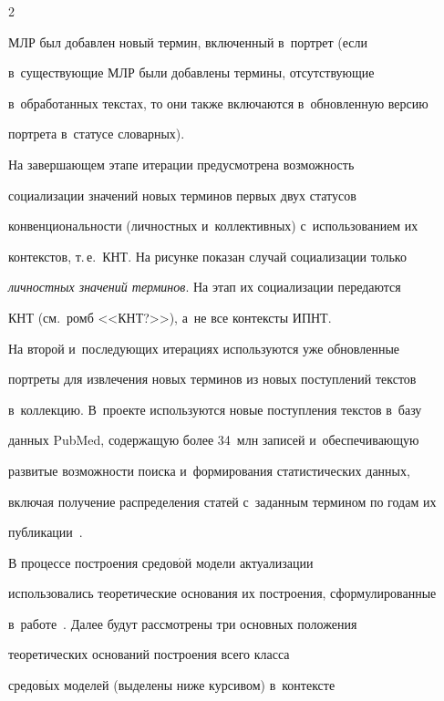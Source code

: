 \begin{multicols}{2}
\begin{enumerate}[(1)]
МЛР был добавлен новый термин, включенный в~портрет (если 

в~существующие МЛР были добавлены термины, отсутствующие 

в~обработанных текстах, то они также включаются в~обновленную версию 

портрета в~статусе словарных).

  \end{enumerate}







  На завершающем этапе итерации предусмотрена возможность 

социализации значений новых терминов первых двух статусов 

конвенциональности (личностных и~коллективных) с~использованием их 

контекстов, т.\,е.\ КНТ. На рисунке показан случай социализации только 

\textit{личностных значений терминов}. На этап их социализации передаются 

КНТ (см.\ ромб <<КНТ?>>), а~не все контексты ИПНТ.

  

  На второй и~последующих итерациях используются уже обновленные 

портреты для извлечения новых терминов из новых поступлений текс\-тов\linebreak 

в~коллекцию. В~проекте используются \mbox{новые} поступления текстов в~базу 

данных PubMed, содержащую более 34~млн записей и~обеспечивающую 

развитые возможности поиска и~формирования \mbox{статистических} данных, 

включая получение распределения статей с~заданным термином по годам их 

публикации~\cite{13-zz}.

  

  В процессе построения средов$\acute{\mbox{о}}$й модели актуализации 

использовались теоретические основания их построения, сформулированные 

в~работе~\cite{14-zz}. Далее будут рассмотрены три основных положения 

теоретических оснований построения всего класса 

средов$\acute{\mbox{ы}}$х моделей (выделены ниже курсивом) в~контексте 


\end{multicols}
